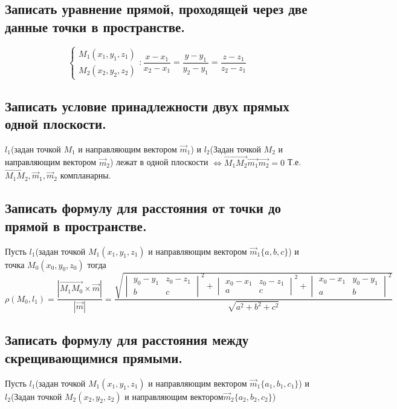 \documentclass[a4paper, 10pt]{article}
\newcommand{\bvec}[1]{\overrightarrow{#1}}
\renewcommand{\a}{\vec{a}}
\renewcommand{\b}{\vec{b}}
\newcommand{\image}[2]{
	\begin{figure}[H]
		\center{\texttt{[image: img/\#1]} }
    \end{figure}
}
\begin{document}
\image{5.png}{200}

\subsection{Записать уравнение прямой, проходящей через две данные точки в пространстве. }

$$\begin{cases}M_1(x_1,y_1,z_1)\\M_2(x_2,y_2,z_2)\end{cases}: 
\frac{x-x_1}{x_2-x_1} = \frac{y-y_1}{y_2-y_1} = \frac{z-z_1}{z_2-z_1}$$

\subsection{Записать условие принадлежности двух прямых одной плоскости.}

$l_1$(задан точкой $M_1$ и направляющим вектором $\vec{m}_1$) и $l_2$(Задан точкой $M_2$ и направляющим 
вектором $\vec{m}_2$) лежат в одной плоскости $\iff \bvec{M_1M_2}\vec{m_1}\vec{m_2} = 0$
Т.е. $\bvec{M_1M_2}, \vec{m}_1, \vec{m}_2$ компланарны. 

\subsection{Записать формулу для расстояния от точки до прямой в пространстве.}

Пусть $l_1$(задан точкой $M_1(x_1, y_1, z_1)$ и направляющим вектором $\vec{m}_1\{a,b,c\}$) и точка 
$M_0(x_0,y_0,z_0)$ тогда 
$$\rho(M_0, l_1) = \frac{ |\bvec{M_1M_0}\times\vec{m}| }{ |\vec{m}| } = 
\frac{\sqrt{\begin{vmatrix}y_0-y_1&z_0-z_1\\b&c\end{vmatrix}^2+
\begin{vmatrix}x_0-x_1&z_0-z_1\\a&c\end{vmatrix}^2+
\begin{vmatrix}x_0-x_1&y_0-y_1\\a&b\end{vmatrix}^2}}{\sqrt{a^2+b^2+c^2}}$$

\subsection{Записать формулу для расстояния между скрещивающимися прямыми.}

Пусть $l_1$(задан точкой $M_1(x_1, y_1, z_1)$ и направляющим вектором $\vec{m}_1\{a_1,b_1,c_1\}$) и 
$l_2$(Задан точкой $M_2(x_2, y_2, z_2)$ и направляющим вектором$\vec{m}_2\{a_2,b_2,c_2\}$)
\end{document}

